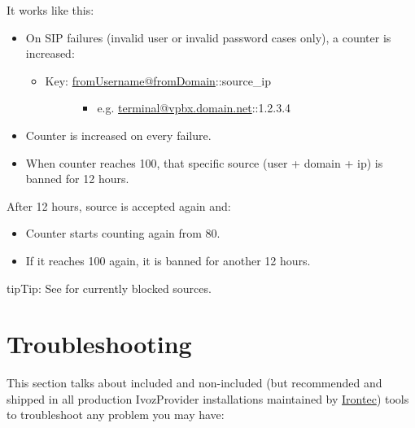 \documentclass[letterpaper,10pt,english]{sphinxmanual}
\begin{document}
It works like this:
\begin{itemize}
\item {} 
On SIP failures (invalid user or invalid password cases only), a counter is increased:
\begin{itemize}
\item {} \begin{description}
\item[{Key: \href{mailto:fromUsername@fromDomain}{fromUsername@fromDomain}::source\_ip}] \leavevmode\begin{itemize}
\item {} 
e.g. \href{mailto:terminal@vpbx.domain.net}{terminal@vpbx.domain.net}::1.2.3.4

\end{itemize}

\end{description}

\end{itemize}

\item {} 
Counter is increased on every failure.

\item {} 
When counter reaches 100, that specific source (user + domain + ip) is banned for 12 hours.

\end{itemize}

After 12 hours, source is accepted again and:
\begin{itemize}
\item {} 
Counter starts counting again from 80.

\item {} 
If it reaches 100 again, it is banned for another 12 hours.

\end{itemize}

\begin{notice}{tip}{Tip:}
See {\hyperref[administration_portal/brand/views/bruteforce_attacks:brute\string-force\string-attacks]{}} for currently blocked sources.
\end{notice}


\chapter{Troubleshooting}
\label{security_and_maintenance/maintenance/index::doc}\label{security_and_maintenance/maintenance/index:troubleshooting}
This section talks about included and non-included (but recommended and shipped in all production IvozProvider
installations maintained by \href{https://www.irontec.com}{Irontec}) tools to troubleshoot any problem you may have:
\end{document}
